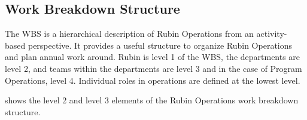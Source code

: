 \subsection{Work Breakdown Structure}
\label{sec:wbs}

The \gls{WBS} is a hierarchical description of \gls{Rubin Operations} from an activity-based perspective.
It provides a useful structure to organize \gls{Rubin Operations} and plan annual work around.
Rubin is level 1 of the \gls{WBS}, the departments are level 2, and teams within the departments are level 3 and in the case of Program \gls{Operations}, level 4.
Individual roles in operations are defined at the lowest level.

 shows the level 2 and level 3 elements of the \gls{Rubin Operations} work breakdown structure.

